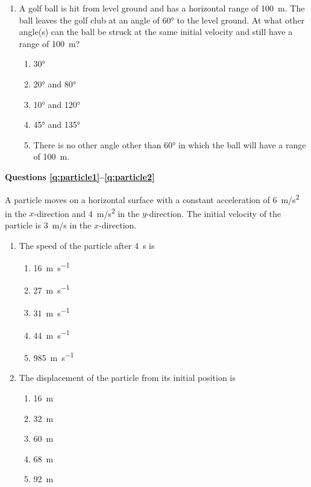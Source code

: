 \documentclass{../../../oss-apphys}
\begin{document}
\begin{multicols}{2}
\begin{enumerate}[resume,leftmargin=18pt]
  \item A golf ball is hit from level ground and has a horizontal range of
    \SI{100}{m}. The ball leaves the golf club at an angle of \ang{60} to the
    level ground. At what other angle(s) can the ball be struck at the same
    initial velocity and still have a range of \SI{100}{m}?
    \begin{center}
      \vspace{-.2in}
    \end{center}
    \begin{enumerate}[noitemsep,topsep=0pt,leftmargin=18pt,label=(\Alph*)]
    \item\ang{30}
    \item\ang{20} and \ang{80}
    \item\ang{10} and \ang{120}
    \item\ang{45} and \ang{135}
    \item There is no other angle other than \ang{60} in which the ball will
      have a range of \SI{100}{m}.
    \end{enumerate}
  \end{enumerate}
  \columnbreak
  
  \textbf{Questions \ref{q:particle1}--\ref{q:particle2}}

  A particle moves on a horizontal surface with a constant acceleration of
  \SI{6}{m/s^2} in the $x$-direction and \SI{4}{m/s^2} in the $y$-direction. The
  initial velocity of the particle is \SI{3}{m/s} in the $x$-direction.
  
  \begin{enumerate}[resume,leftmargin=18pt]
  \item The speed of the particle after \SI{4}{\second} is
    \begin{enumerate}[noitemsep,topsep=0pt,leftmargin=18pt,label=(\Alph*)]
    \item\SI{16 }{\metre\per\second}
    \item\SI{27 }{\metre\per\second}
    \item\SI{31 }{\metre\per\second}
    \item\SI{44 }{\metre\per\second}
    \item\SI{985}{\metre\per\second}
    \end{enumerate}
    \label{q:particle1}
    
  \item The displacement of the particle from its initial position is
    \begin{enumerate}[noitemsep,topsep=0pt,leftmargin=18pt,label=(\Alph*)]
    \item\SI{16}{\metre}
    \item\SI{32}{\metre}
    \item\SI{60}{\metre}
    \item\SI{68}{\metre}
    \item\SI{92}{\metre}
    \end{enumerate}
    \label{q:particle2}
    

\end{enumerate}
\end{multicols}
\end{document}
